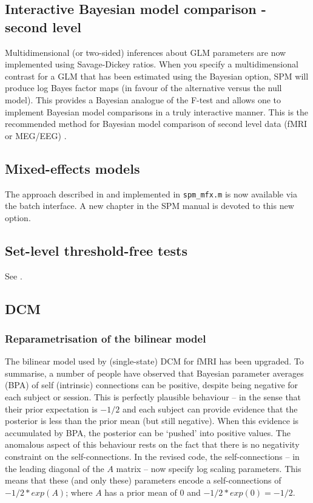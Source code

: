 \documentclass[a4paper,titlepage,openany]{article}
\begin{document}
\begin{multicols}{2}
\subsection{Interactive Bayesian model comparison - second level}

Multidimensional (or two-sided) inferences about GLM parameters  are now implemented using Savage-Dickey ratios.  When you specify a multidimensional contrast for a GLM that has been estimated using the Bayesian option, SPM will produce log Bayes factor maps (in favour of the alternative versus the null model). This provides a Bayesian analogue of the F-test and allows one to implement Bayesian model comparisons in a truly interactive manner.
This is the recommended method for Bayesian model comparison of second level data (fMRI or MEG/EEG) .

\subsection{Mixed-effects models}

The approach described in \cite{karl_mixed} and implemented in \texttt{spm\_mfx.m} is now available via the batch interface. A new chapter in the SPM manual is devoted to this new option.

\subsection{Set-level threshold-free tests}

See \cite{Barnes2013}.

\subsection{DCM}

\subsubsection{Reparametrisation of the bilinear model}

The bilinear model used by (single-state) DCM for fMRI has been upgraded. To summarise, a number of people have observed that Bayesian parameter averages (BPA) of self (intrinsic) connections can be positive, despite being negative for each subject or session. This is perfectly plausible behaviour -- in the sense that their prior expectation is $-1/2$ and each subject can provide evidence that the posterior is less than the prior mean (but still negative). When this evidence is accumulated by BPA, the posterior can be `pushed' into positive values. The anomalous aspect of this behaviour rests on the fact that there is no negativity constraint on the self-connections.  In the revised code, the self-connections -- in the leading diagonal of the $A$ matrix -- now specify log scaling parameters. This means that these (and only these) parameters encode a self-connections of $-1/2*exp(A)$; where $A$ has a prior mean of $0$ and $-1/2*exp(0) = -1/2$. 


\end{multicols}
\end{document}
